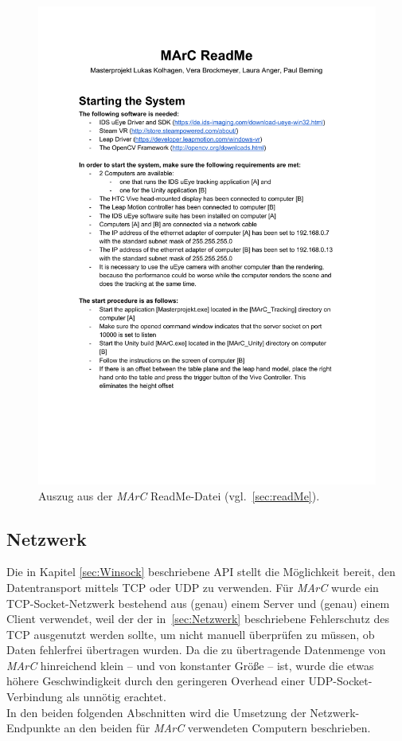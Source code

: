\begin{figure}
	\centering
	\includegraphics[page=1, trim=1cm 12.25cm 1cm 5.25cm, clip, width=\textwidth]{kapitel/anhang/ReadMe.pdf} 
	\caption{Auszug aus der \emph{MArC} ReadMe-Datei (vgl.~\ref{sec:readMe}).}
	\label{fig:marcReadMe}
\end{figure}

\subsection{Netzwerk}\label{sec:netzwerk}

Die in Kapitel \ref{sec:Winsock} beschriebene API stellt die Möglichkeit bereit, den Datentransport mittels TCP oder UDP zu verwenden. Für \emph{MArC} wurde ein TCP-Socket-Netzwerk bestehend aus (genau) einem Server und (genau) einem Client verwendet, weil der der in~\ref{sec:Netzwerk} beschriebene Fehlerschutz des TCP ausgenutzt werden sollte, um nicht manuell überprüfen zu müssen, ob Daten fehlerfrei übertragen wurden. Da die zu übertragende Datenmenge von \emph{MArC} hinreichend klein -- und von konstanter Größe -- ist, wurde die etwas höhere Geschwindigkeit durch den geringeren Overhead einer UDP-Socket-Verbindung als unnötig erachtet.\\
In den beiden folgenden Abschnitten wird die Umsetzung der Netzwerk-Endpunkte an den beiden für \emph{MArC} verwendeten Computern beschrieben.
